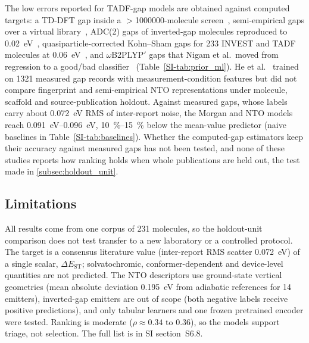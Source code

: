 The low errors reported for TADF-gap models are obtained against computed targets:
a TD-DFT gap inside a $>$\num{1000000}-molecule screen~\cite{Gomez-Bombarelli2016},
semi-empirical gaps over a virtual library~\cite{Thapa2025}, ADC(2) gaps of
inverted-gap molecules reproduced to \qty{0.02}{\electronvolt}~\cite{Barneschi2024},
quasiparticle-corrected Kohn--Sham gaps for \num{233} INVEST and TADF molecules at
\qty{0.06}{\electronvolt}~\cite{Li2026}, and $\omega$B2PLYP$'$ gaps that Nigam
et al.\ moved from regression to a good/bad classifier~\cite{Nigam2024}
(Table~\ref{SI-tab:prior_ml}). He et al.~\cite{He2026} trained on \num{1321}
measured gap records with measurement-condition features but did not compare
fingerprint and semi-empirical NTO representations under molecule, scaffold and
source-publication holdout.
Against measured gaps, whose labels carry about \qty{0.072}{\electronvolt} RMS of
inter-report noise, the Morgan and NTO models reach \qtyrange{0.091}{0.096}{\electronvolt},
\qtyrange{10}{15}{\percent} below the mean-value predictor (naive baselines in
Table~\ref{SI-tab:baselines}). Whether the computed-gap estimators keep their
accuracy against measured gaps has not been tested, and none of these studies reports how ranking holds when whole publications are held out, the test made in \cref{subsec:holdout_unit}.

\subsection{Limitations}\label{subsec:limitations}

All results come from one corpus of \num{231} molecules, so the holdout-unit comparison does not
test transfer to a new laboratory or a controlled protocol. The target is a consensus
literature value (inter-report RMS scatter \qty{0.072}{\electronvolt}) of a single scalar,
$\Delta E_\text{ST}$; solvatochromic, conformer-dependent and device-level quantities are not
predicted. The NTO descriptors use ground-state vertical geometries (mean absolute deviation
\qty{0.195}{\electronvolt} from adiabatic references for \num{14} emitters), inverted-gap
emitters are out of scope (both negative labels receive positive predictions), and only
tabular learners and one frozen pretrained encoder were tested. Ranking is moderate
($\rho \approx 0.34$ to $0.36$), so the models support triage, not selection. The full list is in
SI section~S6.8.
